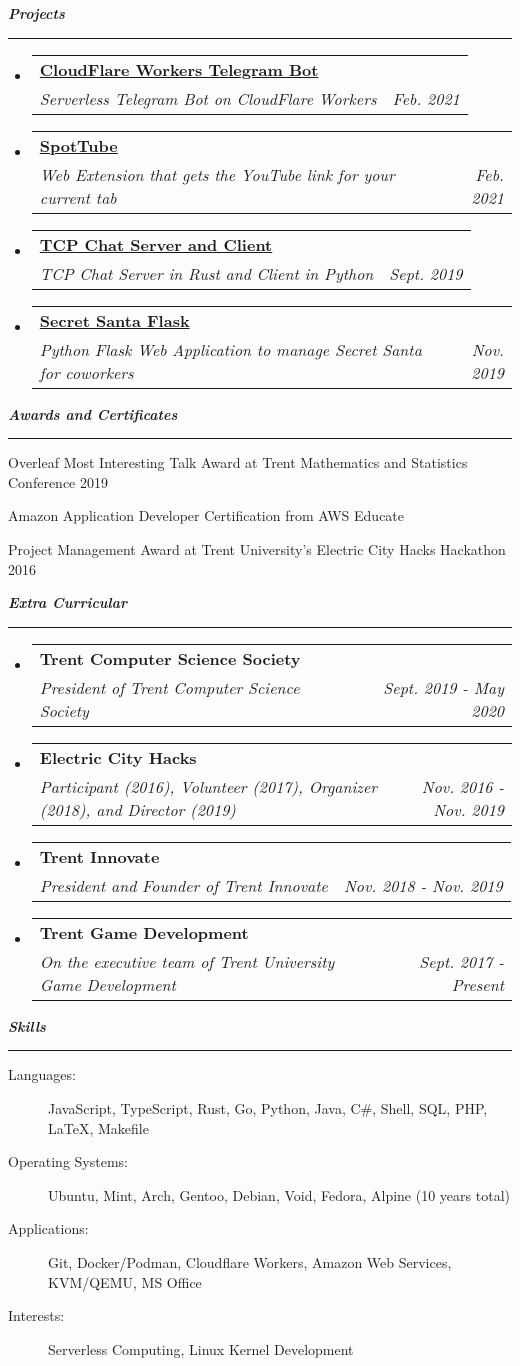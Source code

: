 \documentclass[letterpaper,11pt]{article}
\makeatletter
\newcommand{\mysection}[1]{\vspace{5pt} {\bfseries \textsl{#1}} \\ {\color{gray} \rule[5pt]{\textwidth}{1pt}}}
\newcommand{\ressubheading}[4]{\begin{tabular*}{6.7in}{l@{\extracolsep{\fill}}r}
        \textbf{#1} & #2 \\
        \textit{#3} & \textit{#4} \\
\end{tabular*}\vspace{-6pt}}
\makeatother
\begin{document}
\mysection{Projects}
\begin{itemize}
    \item
        \ressubheading{\href{https://github.com/codebam/cf-workers-telegram-bot}{CloudFlare Workers Telegram Bot}}{}{Serverless Telegram Bot on CloudFlare Workers}{Feb. 2021}
    \item
        \ressubheading{\href{https://github.com/codebam/spottube}{SpotTube}}{}{Web Extension that gets the YouTube link for your current tab}{Feb. 2021}
    \item
        \ressubheading{\href{https://github.com/codebam/chatserver-rust}{TCP Chat Server and Client}}{}{TCP Chat Server in Rust and Client in Python}{Sept. 2019}
    \item
        \ressubheading{\href{https://github.com/codebam/secret\_santa}{Secret Santa Flask}}{}{Python Flask Web Application to manage Secret Santa for coworkers}{Nov. 2019}
\end{itemize}

\mysection{Awards and Certificates}
\begin{description}
    \item Overleaf Most Interesting Talk Award at Trent Mathematics and Statistics Conference 2019
    \item Amazon Application Developer Certification from AWS Educate
    \item Project Management Award at Trent University's Electric City Hacks Hackathon 2016
\end{description}

\mysection{Extra Curricular}
\begin{itemize}
    \item
        \ressubheading{Trent Computer Science Society}{}{President of Trent Computer Science Society}{Sept. 2019 - May 2020}
    \item
        \ressubheading{Electric City Hacks}{}{Participant (2016), Volunteer
            (2017), Organizer (2018), and Director (2019)}{Nov. 2016 - Nov. 2019}
    \item
        \ressubheading{Trent Innovate}{}{President and Founder of Trent Innovate}{Nov. 2018 - Nov. 2019}
    \item
        \ressubheading{Trent Game Development}{}{On the executive team of Trent University Game Development}{Sept. 2017 - Present}
\end{itemize}

\mysection{Skills}
\begin{description}
    \item[Languages:]
        JavaScript, TypeScript, Rust, Go, Python, Java, C\#, Shell, SQL, PHP, \LaTeX{}, Makefile
    \item[Operating Systems:]
        Ubuntu, Mint, Arch, Gentoo, Debian, Void, Fedora, Alpine (10 years total)
    \item[Applications:]
        Git, Docker/Podman, Cloudflare Workers, Amazon Web Services, KVM/QEMU, MS Office
    \item[Interests:]
        Serverless Computing, Linux Kernel Development
\end{description}
\end{document}
